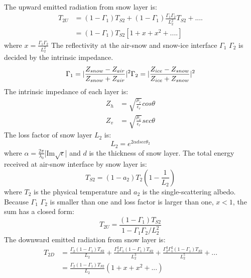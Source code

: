 The upward emitted radiation from snow layer is:
\begin{equation*}
\begin{split}
  T_{2U} &= (1-\Gamma_1)T_{S2}+(1-\Gamma_1)\frac{\Gamma_1\Gamma_2}{L_2^2}T_{S2}+....\\
         &= (1-\Gamma_1)T_{S2}[1+x+x^2+....]
\end{split}
\end{equation*}
where $x=\frac{\Gamma_1\Gamma_2}{L_2^2}$
The reflectivity at the air-snow and snow-ice interface $\Gamma_1$ $\Gamma_2$ is decided by the intrinsic impedance. 
\begin{equation*}
  \Gamma_1 = \lvert\frac{Z_{snow}-Z_{air}}{Z_{snow}+Z_{air}}\rvert^2\\
  \Gamma_2 = \lvert\frac{Z_{ice}-Z_{snow}}{Z_{ice}+Z_{snow}}\rvert^2\\
\end{equation*}
The intrinsic impedance of each layer is:
\begin{equation*}
  \begin{split}
    Z_h&=\sqrt{\frac{\mu_r}{\epsilon_r}}cos\theta \\
    Z_v&=\sqrt{\frac{\mu_r}{\epsilon_r}}sec\theta
  \end{split}
\end{equation*}
The loss factor of snow layer $L_2$ is:
\begin{equation*}
  L_2=e^{2\alpha dsec\theta_2}
\end{equation*}
where $\alpha=\frac{2\pi}{\lambda_0}$|Im$\sqrt{\epsilon}$| and $d$ is the thickness of snow layer.
The total energy received at air-snow interface by snow layer is:
\begin{equation*}
  T_{S2}=(1-a_2)T_2(1-\frac{1}{L_2})
\end{equation*}
where $T_2$ is the physical temperature and $a_2$ is the single-scattering albedo.
Because $\Gamma_1$ $\Gamma_2$ is smaller than one and loss factor is larger than one, $x<1$, the sum has a closed form:
\begin{equation*}
  T_{2U} = \frac{(1-\Gamma_1)T_{S2}}{1-\Gamma_1\Gamma_2/L_2^2}
\end{equation*}
The downward emitted radiation from snow layer is:
\begin{equation*}
\begin{split}
  T_{2D} &= \frac{\Gamma_2(1-\Gamma_1)T_{S2}}{L_2}+\frac{\Gamma_2^2\Gamma_1(1-\Gamma_1)T_{S2}}{L_2^3}+\frac{\Gamma_2^3\Gamma_1^2(1-\Gamma_1)T_{S2}}{L_2^5}+...\\
         &= \frac{\Gamma_2(1-\Gamma_1)T_{S2}}{L_2}(1+x+x^2+...)
\end{split}
\end{equation*}

